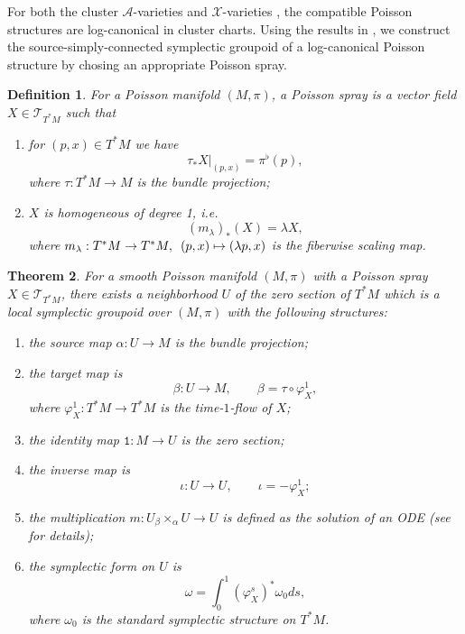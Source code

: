 \documentclass{amsart}
\newtheorem{theorem}{Theorem}[section]
\newtheorem{definition}[theorem]{Definition}
\numberwithin{equation}{section}
\newcommand{\cA}{\mathcal{A}}
\newcommand{\cT}{\mathcal{T}}
\newcommand{\cX}{\mathcal{X}}
\begin{document}
For both the cluster $\cA$-varieties \cite{GSV10} and $\cX$-varieties \cite{FG09c}, the compatible Poisson structures are log-canonical in cluster charts.
Using the results in \cite{MR2900786, CMS17}, we construct the source-simply-connected symplectic groupoid of a log-canonical Poisson structure by chosing an appropriate Poisson spray. 
\begin{definition} 
  \cite{MR2900786}
  For a Poisson manifold $(M, \pi)$, a \emph{Poisson spray} is a vector field $X \in \cT_{T^*M}$ such that
  \begin{enumerate}
    \item for $(p,x) \in T^*M$ we have
      \[\tau_* X|_{(p,x)} = \pi^\flat(p),\]
      where $\tau: T^*M \to M$ is the bundle projection;
    \item $X$ is homogeneous of degree 1, i.e.
      \[(m_\lambda)_*(X) = \lambda X,\]
      where $m_\lambda: T^*M \to T^*M, \enskip (p,x) \mapsto (\lambda p,x)$ is the fiberwise scaling map.
  \end{enumerate}
\end{definition}

\begin{theorem} 
  \cite{MR2900786, CMS17} 
  \label{thm:poissp}
  For a smooth Poisson manifold $(M, \pi)$ with a Poisson spray $X \in \cT_{T^*M}$, there exists a neighborhood $U$ of the zero section of $T^*M$ which is a local symplectic groupoid over $(M, \pi)$ with the following structures:
  \begin{enumerate}
    \item the source map $\alpha: U \to M$ is the bundle projection;
    \item the target map is
      \[\beta: U \to M, \qquad \beta = \tau \circ \varphi_X^1,\]
      where $\varphi_X^1: T^*M \to T^*M$ is the time-$1$-flow of $X$;
    \item the identity map $\mathtt{1}: M \to U$ is the zero section;
    \item the inverse map is
      \[\iota: U \to U, \qquad \iota = -\varphi_X^1;\]
    \item the multiplication $m: U {_\beta \times_\alpha} U \to U$ is defined as the solution of an ODE (see \cite{CMS17} for details);
    \item the symplectic form on $U$ is
      \[\omega = \int_{0}^{1} (\varphi_X^s)^*\omega_0 ds,\]
      where $\omega_0$ is the standard symplectic structure on $T^*M$.
  \end{enumerate}
\end{theorem}
\end{document}
